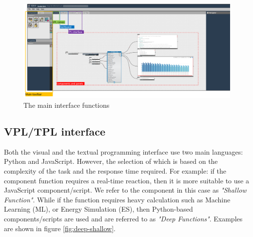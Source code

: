 \documentclass{scsSimAUDPaperFormat}
\begin{document}
\begin{figure}[h]
\centering
\includegraphics[width=\columnwidth]{imgs/platform_interface.png}
\caption{The main interface functions}
\label{fig:platformInterface}
\end{figure}

\subsection{VPL/TPL interface}
Both the visual and the textual programming interface use two main languages: Python and JavaScript. However, the selection of which is based on the complexity of the task and the response time required. For example: if the component function requires a real-time reaction, then it is more suitable to use a JavaScript component/script. We refer to the component in this case as \textit{"Shallow Function"}. While if the function requires heavy calculation such as Machine Learning (ML), or Energy Simulation (ES), then Python-based components/scripts are used and are referred to as \textit{"Deep Functions"}. Examples are shown in figure \ref{fig:deep-shallow}. 
\end{document}
